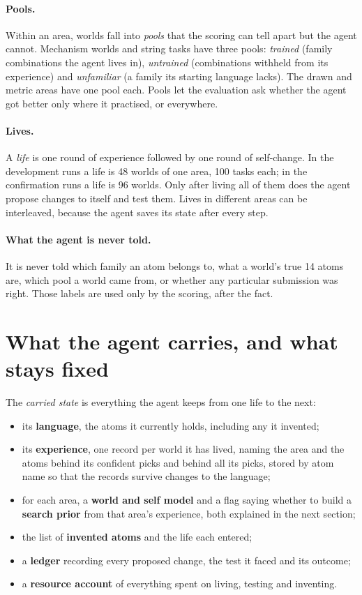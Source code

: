 \documentclass[11pt]{article}
\begin{document}
\paragraph{Pools.} Within an area, worlds fall into \emph{pools} that the scoring can tell apart but the agent cannot. Mechanism worlds and string tasks have three pools: \emph{trained} (family combinations the agent lives in), \emph{untrained} (combinations withheld from its experience) and \emph{unfamiliar} (a family its starting language lacks). The drawn and metric areas have one pool each. Pools let the evaluation ask whether the agent got better only where it practised, or everywhere.

\paragraph{Lives.} A \emph{life} is one round of experience followed by one round of self-change. In the development runs a life is 48 worlds of one area, 100 tasks each; in the confirmation runs a life is 96 worlds. Only after living all of them does the agent propose changes to itself and test them. Lives in different areas can be interleaved, because the agent saves its state after every step.

\paragraph{What the agent is never told.} It is never told which family an atom belongs to, what a world's true 14 atoms are, which pool a world came from, or whether any particular submission was right. Those labels are used only by the scoring, after the fact.

\section{What the agent carries, and what stays fixed}

The \emph{carried state} is everything the agent keeps from one life to the next:

\begin{itemize}[leftmargin=*]
\item its \textbf{language}, the atoms it currently holds, including any it invented;
\item its \textbf{experience}, one record per world it has lived, naming the area and the atoms behind its confident picks and behind all its picks, stored by atom name so that the records survive changes to the language;
\item for each area, a \textbf{world and self model} and a flag saying whether to build a \textbf{search prior} from that area's experience, both explained in the next section;
\item the list of \textbf{invented atoms} and the life each entered;
\item a \textbf{ledger} recording every proposed change, the test it faced and its outcome;
\item a \textbf{resource account} of everything spent on living, testing and inventing.
\end{itemize}
\end{document}
